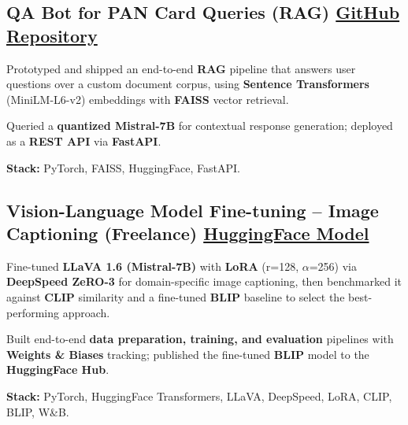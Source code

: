 \documentclass[letter,10pt]{article}
\begin{document}
\subsection{QA Bot for PAN Card Queries (RAG) \hfill \href{https://github.com/sunil448832/Natural-Language-Processing/tree/master/RAG(Retrieval\%20Augment\%20Generation)}{GitHub Repository}}
\begin{zitemize}
\item Prototyped and shipped an end-to-end \textbf{RAG} pipeline that answers user questions over a custom document corpus, using \textbf{Sentence Transformers} (MiniLM-L6-v2) embeddings with \textbf{FAISS} vector retrieval.
\item Queried a \textbf{quantized Mistral-7B} for contextual response generation; deployed as a \textbf{REST API} via \textbf{FastAPI}.
\item \textbf{Stack:} PyTorch, FAISS, HuggingFace, FastAPI.
\end{zitemize}

\subsection{Vision-Language Model Fine-tuning – Image Captioning (Freelance) \hfill \href{https://huggingface.co/sunil448832/blip-model}{HuggingFace Model}}
\begin{zitemize}
\item Fine-tuned \textbf{LLaVA 1.6 (Mistral-7B)} with \textbf{LoRA} (r=128, $\alpha$=256) via \textbf{DeepSpeed ZeRO-3} for domain-specific image captioning, then benchmarked it against \textbf{CLIP} similarity and a fine-tuned \textbf{BLIP} baseline to select the best-performing approach.
\item Built end-to-end \textbf{data preparation, training, and evaluation} pipelines with \textbf{Weights \& Biases} tracking; published the fine-tuned \textbf{BLIP} model to the \textbf{HuggingFace Hub}.
\item \textbf{Stack:} PyTorch, HuggingFace Transformers, LLaVA, DeepSpeed, LoRA, CLIP, BLIP, W\&B.
\end{zitemize}
\end{document}
